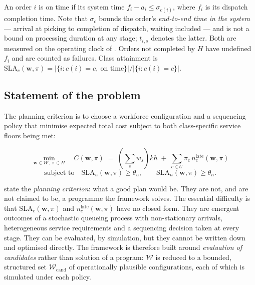 An order \(i\) is on time if its system time \(f_i - a_i \leq \sigma_{c(i)}\), where \(f_i\) is
its dispatch completion time. Note that \(\sigma_c\) bounds the order's \emph{end-to-end time in
the system} --- arrival at picking to completion of dispatch, waiting included --- and is not a
bound on processing duration at any stage; \(t_{i,s}\) denotes the latter. Both are measured on
the operating clock of . Orders not completed by \(H\) have undefined \(f_i\) and are
counted as failures. Class attainment is
\(\text{SLA}_c(\mathbf{w}, \pi) = \left|\{i : c(i) = c,\ \text{on time}\}\right| /
\left|\{i : c(i) = c\}\right|\).

\subsection{Statement of the problem}

The planning criterion is to choose a workforce configuration and a sequencing policy that
minimise expected total cost subject to both class-specific service floors being met:

\begin{equation}
\min_{\mathbf{w} \in \mathcal{W},\; \pi \in \Pi}\quad
C(\mathbf{w}, \pi)
\;=\;
\left(\textstyle\sum_{s} w_s\right) k h
\;+\; \sum_{c \in \mathcal{C}} \pi_c \, n^{\text{late}}_c(\mathbf{w}, \pi)
\label{eq:problem}
\end{equation}
\begin{equation}
\text{subject to}\quad
\text{SLA}_u(\mathbf{w}, \pi) \geq \theta_u,
\qquad
\text{SLA}_n(\mathbf{w}, \pi) \geq \theta_n.
\label{eq:problem-constraints}
\end{equation}

 state the \emph{planning criterion}: what a good plan
would be. They are not, and are not claimed to be, a programme the framework solves. The
essential difficulty is that \(\text{SLA}_c(\mathbf{w}, \pi)\) and
\(n^{\text{late}}_c(\mathbf{w}, \pi)\) have no closed form. They are emergent outcomes of a
stochastic queueing process with non-stationary arrivals, heterogeneous service requirements
and a sequencing decision taken at every stage. They can be evaluated, by simulation, but they
cannot be written down and optimised directly. The framework is therefore built around
\emph{evaluation of candidates} rather than solution of a program: \(\mathcal{W}\) is reduced
to a bounded, structured set \(\mathcal{W}_{\text{cand}}\) of operationally plausible
configurations, each of which is simulated under each policy.

